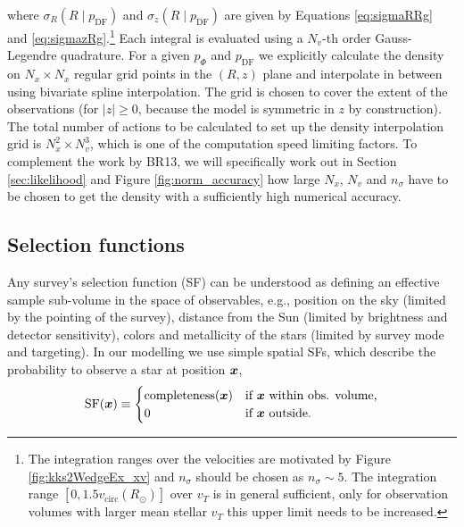 where $\sigma_R(R \mid p_\text{DF})$ and $\sigma_z(R \mid p_\text{DF})$ are given by Equations \ref{eq:sigmaRRg} and \ref{eq:sigmazRg}.\footnote{The integration ranges over the velocities are motivated by Figure \ref{fig:kks2WedgeEx_xv} and $n_\sigma$ should be chosen as $n_\sigma \sim 5$. The integration range $[0,1.5 v_\text{circ}(R_\odot)]$ over $v_T$ is in general sufficient, only for observation volumes with larger mean stellar $v_T$ this upper limit needs to be increased.} Each integral is evaluated using a $N_v$-th order Gauss-Legendre quadrature. For a given $p_\Phi$ and $p_\text{DF}$ we explicitly calculate the density on $N_x \times N_x$ regular grid points in the $(R,z)$ plane and interpolate in between using bivariate spline interpolation. The grid is chosen to cover the extent of the observations (for $|z|\geq0$, because the model is symmetric in $z$ by construction). The total number of actions to be calculated to set up the density interpolation grid is $N_x^2 \times N_v^3$, which is one of the computation speed limiting factors. To complement the work by BR13, we will specifically work out in Section \ref{sec:likelihood} and Figure \ref{fig:norm_accuracy} how large $N_x$, $N_v$ and $n_\sigma$ have to be chosen to get the density with a sufficiently high numerical accuracy. 


\subsection{Selection functions} \label{sec:selectionfunction}

Any survey's selection function (SF) can be understood as defining an effective sample sub-volume in the space of observables, e.g., position on the sky (limited by the pointing of the survey), distance from the Sun (limited by brightness and detector sensitivity), colors and metallicity of the stars (limited by survey mode and targeting). In our modelling we use simple spatial SFs, which describe the probability to observe a star at position $\boldsymbol{x}$,
\begin{eqnarray*}
\text{SF}(\boldsymbol{x}) \equiv \begin{cases}
\text{completeness}(\boldsymbol{x}) &\text{if $\boldsymbol{x}$ within obs. volume,}\\
0 & \text{if $\boldsymbol{x}$ outside.}
\end{cases}
\end{eqnarray*}


